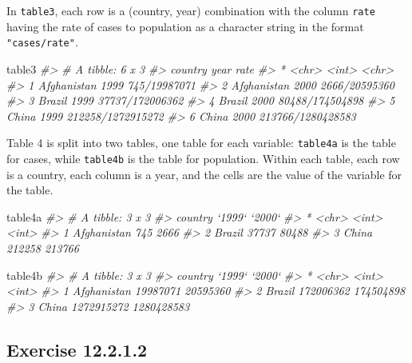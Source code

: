 \documentclass[]{book}
\newenvironment{Shaded}{\begin{snugshade}}{\end{snugshade}}
\newcommand{\CommentTok}[1]{\textcolor[rgb]{0.56,0.35,0.01}{\textit{#1}}}
\newcommand{\NormalTok}[1]{#1}
\theoremstyle{plain}
\theoremstyle{remark}
\begin{document}
In \texttt{table3}, each row is a (country, year) combination with the
column \texttt{rate} having the rate of cases to population as a
character string in the format \texttt{"cases/rate"}.

\begin{Shaded}
\begin{Highlighting}[]
\NormalTok{table3}
\CommentTok{#> # A tibble: 6 x 3}
\CommentTok{#>   country      year rate             }
\CommentTok{#> * <chr>       <int> <chr>            }
\CommentTok{#> 1 Afghanistan  1999 745/19987071     }
\CommentTok{#> 2 Afghanistan  2000 2666/20595360    }
\CommentTok{#> 3 Brazil       1999 37737/172006362  }
\CommentTok{#> 4 Brazil       2000 80488/174504898  }
\CommentTok{#> 5 China        1999 212258/1272915272}
\CommentTok{#> 6 China        2000 213766/1280428583}
\end{Highlighting}
\end{Shaded}

Table 4 is split into two tables, one table for each variable:
\texttt{table4a} is the table for cases, while \texttt{table4b} is the
table for population. Within each table, each row is a country, each
column is a year, and the cells are the value of the variable for the
table.

\begin{Shaded}
\begin{Highlighting}[]
\NormalTok{table4a}
\CommentTok{#> # A tibble: 3 x 3}
\CommentTok{#>   country     `1999` `2000`}
\CommentTok{#> * <chr>        <int>  <int>}
\CommentTok{#> 1 Afghanistan    745   2666}
\CommentTok{#> 2 Brazil       37737  80488}
\CommentTok{#> 3 China       212258 213766}
\end{Highlighting}
\end{Shaded}

\begin{Shaded}
\begin{Highlighting}[]
\NormalTok{table4b}
\CommentTok{#> # A tibble: 3 x 3}
\CommentTok{#>   country         `1999`     `2000`}
\CommentTok{#> * <chr>            <int>      <int>}
\CommentTok{#> 1 Afghanistan   19987071   20595360}
\CommentTok{#> 2 Brazil       172006362  174504898}
\CommentTok{#> 3 China       1272915272 1280428583}
\end{Highlighting}
\end{Shaded}

\hypertarget{exercise-12.2.1.2}{%
\subsection*{\texorpdfstring{Exercise
{12.2.1.2}}{Exercise 12.2.1.2}}\label{exercise-12.2.1.2}}
\end{document}
